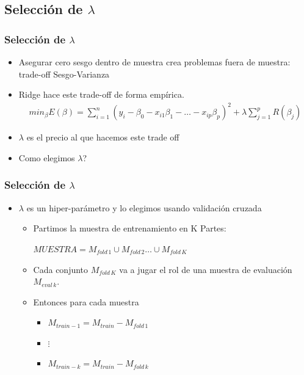 \documentclass[
  shownotes,
  xcolor={svgnames},
  hyperref={colorlinks,citecolor=DarkBlue,linkcolor=andesred,urlcolor=DarkBlue}
  , aspectratio=169]{beamer}
\begin{document}
\subsection{Selección de $\lambda$}
\begin{frame}[fragile]
\frametitle{Selección de $\lambda$ }


\begin{itemize}
    \item Asegurar cero sesgo dentro de muestra crea problemas fuera de muestra: trade-off Sesgo-Varianza
    \medskip
    \item Ridge hace este trade-off de forma empírica.
    \medskip
    \begin{align}
            min_{\beta} E(\beta) = \sum_{i=1}^n (y_i-\beta_0 - x_{i1}\beta_1 - \dots - x_{ip}\beta_p)^2 + \lambda \sum_{j=1}^p R(\beta_j)
    \end{align}
\item $\lambda$ es el precio al que hacemos este trade off
\medskip
 \item Como elegimos $\lambda$?

 \end{itemize}
\end{frame}
\begin{frame}[fragile]
\frametitle{Selección de $\lambda$ }



\begin{itemize}

 \item $\lambda$ es un hiper-parámetro y lo elegimos usando validación cruzada
\medskip
    \begin{itemize}
     \item Partimos la muestra de entrenamiento en K Partes: 

     $MUESTRA= M_{fold\,1} \cup M_{fold\,2} \dots \cup M_{fold\,K}$
     \medskip
     \item Cada conjunto  $M_{fold\,K}$ va a jugar el rol de una muestra de evaluación $M_{eval\,k}$.  
     \medskip
     \item Entonces para cada muestra
             \begin{itemize}
          \item  $M_{train-1}=M_{train} - M_{fold\,1}$
          \medskip
          \item    $\vdots$
          \medskip
          \item   $M_{train-k}=M_{train} - M_{fold\,k}$
         \end{itemize} 
    \end{itemize}  
 \end{itemize}

\end{frame}
\end{document}
